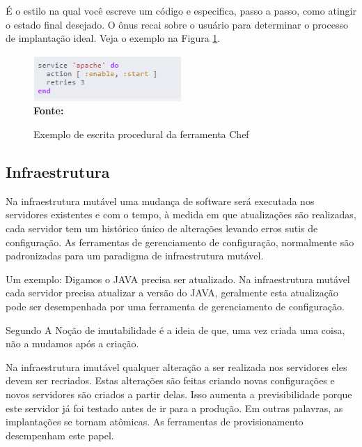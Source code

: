   
  É o estilo na qual você escreve um código e especifica, passo a passo, como atingir o estado final desejado. O ônus recai sobre o usuário para determinar o processo de implantação ideal. Veja o exemplo na Figura \ref{fig:figura1}.

\begin{figure}[ht]
	\centering	
	\caption[\hspace{0.1cm}Exemplo procedural]{Exemplo de escrita procedural da ferramenta Chef}
	\vspace{-0.4cm}
	\includegraphics[width=0.5\textwidth]{figuras/chef-io-exemplo-procedural.png}
	 \vspace{-0.2cm}
	\\\textbf{\footnotesize Fonte: \cite{chef01}}
	\label{fig:figura1}
\end{figure}
\vspace{-0.5cm}
  

 \subsection{Infraestrutura}
 
 Na infraestrutura mutável uma mudança de software será executada nos servidores existentes e com o tempo, à medida em que atualizações são realizadas, cada servidor tem um histórico único de alterações levando erros sutis de configuração. As ferramentas de gerenciamento de configuração, normalmente são padronizadas para um paradigma de infraestrutura mutável.
 
  Um exemplo: Digamos o JAVA precisa ser atualizado. Na infraestrutura mutável cada servidor precisa atualizar a versão do JAVA, geralmente esta atualização pode ser desempenhada por uma ferramenta de gerenciamento de configuração. 
 
  Segundo  A Noção de imutabilidade é a ideia de que, uma vez criada uma coisa, não a mudamos após a criação.
 
 Na infraestrutura imutável qualquer alteração a ser realizada nos servidores eles devem ser recriados. Estas alterações são feitas criando novas configurações e novos servidores são criados a partir delas. Isso aumenta a previsibilidade porque este servidor já foi testado antes de ir para a produção. Em outras palavras, as implantações se tornam atômicas. As ferramentas de provisionamento desempenham este papel.\cite{Morris:2016:ICM:3006361}
 
